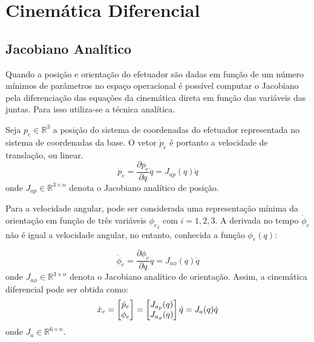\section{Cinemática Diferencial}

\subsection{Jacobiano Analítico}
Quando a posição e orientação do efetuador são dadas em função de um número mínimos de parâmetros no espaço operacional é possível computar o Jacobiano pela diferenciação das equações da cinemática direta em função das variáveis das juntas.
Para isso utiliza-se a técnica analítica.

Seja ${p}_e \in \mathbb{R}^3$ a posição do sistema de coordenadas do efetuador representada no sistema de coordenadas da base. O vetor $\dot{{p}}_e$ é portanto a velocidade de translação, ou linear.
\begin{equation} \label{eq:jacob_pos}
\dot{{p}}_e = \frac{\partial {p}_e }{\partial {q}} {\dot{q}} = {J}_{ap} ({q}) {\dot{q}} 
\end{equation}
onde ${J}_{ap} \in \mathbb{R}^{3 \times n} $ denota o Jacobiano analítico de posição.

Para a velocidade angular, pode ser considerada uma representação mínima da orientação em função de três variáveis ${\phi_e}_i$ com $i=1,2,3$. 
A derivada no tempo $\dot{{\phi}}_e$ não é igual a velocidade angular, no entanto, conhecida a função ${\phi}_e({q})$:

\begin{equation} \label{eq:jacob_or}
\dot{{\phi}}_e = \frac{\partial {\phi}_e}{\partial {q}} {\dot{q}} = {J}_{a\phi}({q}){\dot{q}}
\end{equation}
onde ${J}_{a\phi}  \in \mathbb{R}^{3 \times n} $ denota o Jacobiano analítico de orientação. Assim, a cinemática diferencial pode ser obtida como:
\begin{equation} \label{eq:jacoba}
\dot{x}_e = \begin{bmatrix} \dot{p}_e \\ \phi_e \end{bmatrix} = \begin{bmatrix} J_{a_p}(q) \\ J_{a_\phi}(q)\end{bmatrix} {\dot{q}} = {J}_a ({q}) \dot{{q}}
\end{equation}
onde ${J}_{a}  \in \mathbb{R}^{6 \times n} $.
 

